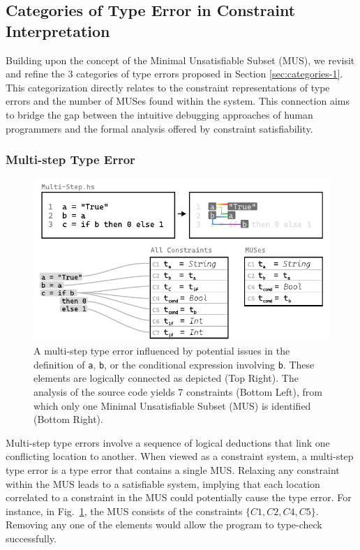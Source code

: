 \documentclass[pdflatex,sn-mathphys-num]{sn-jnl}%
\begin{document}
\subsection{Categories of Type Error in Constraint Interpretation} \label{sec:categories-2}

Building upon the concept of the Minimal Unsatisfiable Subset (MUS), we revisit and refine the 3 categories of type errors proposed in Section \ref{sec:categories-1}. This categorization directly relates to the constraint representations of type errors and the number of MUSes found within the system. This connection aims to bridge the gap between the intuitive debugging approaches of human programmers and the formal analysis offered by constraint satisfiability.

\subsubsection*{Multi-step Type Error}

\begin{figure}[hbt]
  \centering \includegraphics[width=\linewidth]{images/Multi-Step-MUS}
  \caption {A multi-step type error influenced by potential issues in the definition of \texttt{a}, \texttt{b}, or the conditional expression involving \texttt{b}. These elements are logically connected as depicted (Top Right). The analysis of the source code yields 7 constraints (Bottom Left), from which only one Minimal Unsatisfiable Subset (MUS) is identified (Bottom Right).
  }
  \label{fig:multi-step-2}
  \end{figure}


Multi-step type errors involve a sequence of logical deductions that link one conflicting location to another. When viewed as a constraint system, a multi-step type error is a type error that contains a single MUS. Relaxing any constraint within the MUS leads to a satisfiable system, implying that each location correlated to a constraint in the MUS could potentially cause the type error. For instance, in Fig.~\ref{fig:multi-step-2}, the MUS consists of the constraints $\{C1, C2, C4, C5\}$. Removing any one of the elements would allow the program to type-check successfully.
\end{document}
